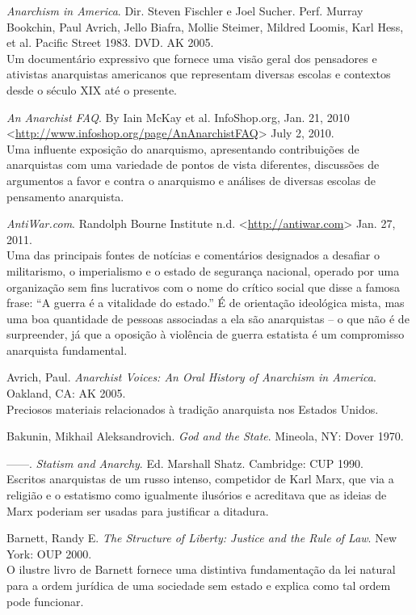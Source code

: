 \setlength{\parskip}{6pt}
\begin{hangparas}{0.25in}{1}
\emph{Anarchism in America}. Dir. Steven Fischler e Joel Sucher. Perf. Murray Bookchin, Paul Avrich, Jello Biafra, Mollie Steimer, Mildred Loomis, Karl Hess, et al. Pacific Street 1983. DVD. AK 2005.\smallskip\\
Um documentário expressivo que fornece uma visão geral dos pensadores e ativistas anarquistas americanos que representam diversas escolas e contextos desde o século XIX até o presente.

\emph{An Anarchist FAQ}. By Iain McKay et al. InfoShop.org, Jan. 21, 2010 <\url{http://www.infoshop.org/page/AnAnarchistFAQ}> July 2, 2010.\smallskip\\
Uma influente exposição do anarquismo, apresentando contribuições de anarquistas com uma variedade de pontos de vista diferentes, discussões de argumentos a favor e contra o anarquismo e análises de diversas escolas de pensamento anarquista.

\emph{AntiWar.com}. Randolph Bourne Institute n.d. <\url{http://antiwar.com}> Jan. 27, 2011.\smallskip\\
Uma das principais fontes de notícias e comentários designados a desafiar o militarismo, o imperialismo e o estado de segurança nacional, operado por uma organização sem fins lucrativos com o nome do crítico social que disse a famosa frase: ``A guerra é a vitalidade do estado.'' É de orientação ideológica mista, mas uma boa quantidade de pessoas associadas a ela são anarquistas -- o que não é de surpreender, já que a oposição à violência de guerra estatista é um compromisso anarquista fundamental.

Avrich, Paul. \emph{Anarchist Voices: An Oral History of Anarchism in America}. Oakland, CA: AK 2005.\smallskip\\
Preciosos materiais relacionados à tradição anarquista nos Estados Unidos.

Bakunin, Mikhail Aleksandrovich. \emph{God and the State}. Mineola, NY: Dover 1970.

------. \emph{Statism and Anarchy}. Ed. Marshall Shatz. Cambridge: CUP 1990.\smallskip\\
Escritos anarquistas de um russo intenso, competidor de Karl Marx, que via a religião e o estatismo como igualmente ilusórios e acreditava que as ideias de Marx poderiam ser usadas para justificar a ditadura.

Barnett, Randy E. \emph{The Structure of Liberty: Justice and the Rule of Law}. New York: OUP 2000.\smallskip\\
O ilustre livro de Barnett fornece uma distintiva fundamentação da lei natural para a ordem jurídica de uma sociedade sem estado e explica como tal ordem pode funcionar.


\end{hangparas}
